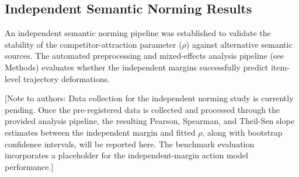 
\subsection{Independent Semantic Norming Results}

An independent semantic norming pipeline was established to validate the stability of the competitor-attraction parameter ($\rho$) against alternative semantic sources. The automated preprocessing and mixed-effects analysis pipeline (see Methods) evaluates whether the independent margins successfully predict item-level trajectory deformations.

[Note to authors: Data collection for the independent norming study is currently pending. Once the pre-registered data is collected and processed through the provided analysis pipeline, the resulting Pearson, Spearman, and Theil-Sen slope estimates between the independent margin and fitted $\rho$, along with bootstrap confidence intervals, will be reported here. The benchmark evaluation incorporates a placeholder for the independent-margin action model performance.]
